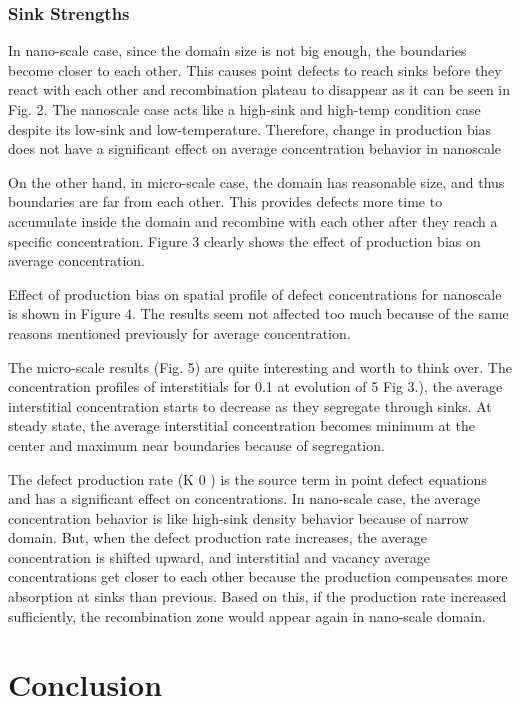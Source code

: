 \documentclass[a4paper]{article}
\begin{document}
    \subsubsection{Sink Strengths}


In nano-scale case, since the domain size is not big enough, the boundaries become
closer to each other. This causes point defects to reach sinks before they react with each other
and recombination plateau to disappear as it can be seen in Fig. 2. The nanoscale case acts like
a high-sink and high-temp condition case despite its low-sink and low-temperature. Therefore,
change in production bias does not have a significant effect on average concentration behavior
in nanoscale

On the other hand, in micro-scale case, the domain has reasonable size, and thus
boundaries are far from each other. This provides defects more time to accumulate inside the
domain and recombine with each other after they reach a specific concentration. Figure 3
clearly shows the effect of production bias on average concentration.

Effect of production bias on spatial profile of defect concentrations for nanoscale is
shown in Figure 4. The results seem not affected too much because of the same reasons
mentioned previously for average concentration.

The micro-scale results (Fig. 5) are quite interesting and worth to think over. The
concentration profiles of interstitials for 0.1%
at evolution of 5%
Fig 3.), the average interstitial concentration starts to decrease as they segregate through sinks.
At steady state, the average interstitial concentration becomes minimum at the center and
maximum near boundaries because of segregation.

The defect production rate (K 0 ) is the source term in point defect equations and has a
significant effect on concentrations.
In nano-scale case, the average concentration behavior is like high-sink density behavior
because of narrow domain. But, when the defect production rate increases, the average
concentration is shifted upward, and interstitial and vacancy average concentrations get closer
to each other because the production compensates more absorption at sinks than previous.
Based on this, if the production rate increased sufficiently, the recombination zone would
appear again in nano-scale domain.\cite{was2016}

\section{Conclusion} \hspace{10pt}



\end{document}
